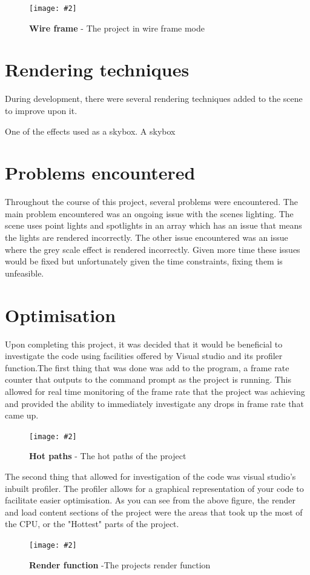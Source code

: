 \documentclass[10pt, a4paper]{article}
\newcommand{\figuremacro}[5]{
    \begin{figure}[#1]
        \centering
        \texttt{[image: \#2]}
        \caption[#3]{\textbf{#3}#4}
        \label{fig:#2}
    \end{figure}
}
\begin{document}
\figuremacro{h}{grayscale.png}{Wire frame}{ - The project in wire frame mode}{1.0}
\section{Rendering techniques}
During development, there were several rendering techniques added to the scene to improve upon it. 

One of the effects used as a skybox. A skybox 
	\section{Problems encountered}
	
Throughout the course of this project, several problems were encountered. The main problem encountered was an ongoing issue with the scenes lighting. The scene uses point lights and spotlights in an array which has an issue that means the lights are rendered incorrectly. The other issue encountered was an issue where the grey scale effect is rendered incorrectly. Given more time these issues would be fixed but unfortunately given the time constraints, fixing them is unfeasible. 
	
\section{Optimisation}
Upon completing this project, it was decided that it would be beneficial to investigate the code using facilities offered by Visual studio and its profiler function.The first thing that was done was add to the program, a frame rate counter that outputs to the command prompt as the project is running. This allowed for real time monitoring of the frame rate that the project was achieving and provided the ability to immediately investigate any drops in frame rate that came up.

\figuremacro{h}{hotpath.jpg}{Hot paths}{ - The hot paths of the project}{1.0}

The second thing that allowed for investigation of the code was visual studio's inbuilt profiler. The profiler allows for a graphical representation of your code to facilitate easier optimisation.
As you can see from the above figure, the render and load content sections of the project were the areas that took up the most of the CPU, or the "Hottest" parts of the project. 

\figuremacro{h}{render.jpg}{Render function}{ -The projects render function}{1.0}
\end{document}
